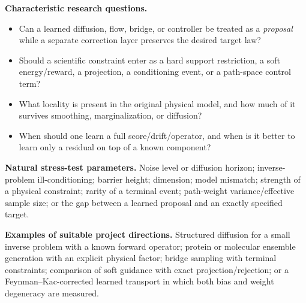 \documentclass[11pt]{article}
\begin{document}
\textbf{Characteristic research questions.}
\begin{itemize}
    \item Can a learned diffusion, flow, bridge, or controller be treated as a \emph{proposal} while a separate correction layer preserves the desired target law?
    \item Should a scientific constraint enter as a hard support restriction, a soft energy/reward, a projection, a conditioning event, or a path-space control term?
    \item What locality is present in the original physical model, and how much of it survives smoothing, marginalization, or diffusion?
    \item When should one learn a full score/drift/operator, and when is it better to learn only a residual on top of a known component?
\end{itemize}

\textbf{Natural stress-test parameters.} Noise level or diffusion horizon; inverse-problem ill-conditioning; barrier height; dimension; model mismatch; strength of a physical constraint; rarity of a terminal event; path-weight variance/effective sample size; or the gap between a learned proposal and an exactly specified target.

\textbf{Examples of suitable project directions.} Structured diffusion for a small inverse problem with a known forward operator; protein or molecular ensemble generation with an explicit physical factor; bridge sampling with terminal constraints; comparison of soft guidance with exact projection/rejection; or a Feynman--Kac-corrected learned transport in which both bias and weight degeneracy are measured.
\end{document}
